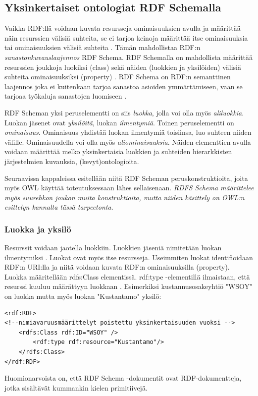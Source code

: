 \documentclass[finnish]{tktltiki2}
\theoremstyle{definition}
\theoremstyle{remark}
\begin{document}
\subsection{Yksinkertaiset ontologiat RDF Schemalla}

Vaikka RDF:llä voidaan kuvata resursseja ominaisuuksien avulla ja määrittää näin resurssien välisiä suhteita, se ei tarjoa keinoja määrittää itse ominaisuuksia tai
ominaisuuksien välisiä suhteita \cite{RDFS}. Tämän mahdollistaa RDF:n \textit{sanastonkuvauslaajennos}
RDF Schema. RDF Schemalla on mahdollista määrittää resurssien joukkoja luokiksi (class) sekä näiden (luokkien ja yksilöiden) välisiä suhteita ominaisuuksiksi (property) \cite{RDFS}. 
RDF Schema on RDF:n semanttinen laajennos joka ei kuitenkaan tarjoa sanastoa asioiden ymmärtämiseen, vaan se tarjoaa työkaluja sanastojen luomiseen \cite{RDFS}. 

RDF Scheman yksi peruselementti on siis \textit{luokka}, jolla voi olla myös \textit{aliluokkia}. Luokan jäsenet ovat \textit{yksilöitä}, luokan \textit{ilmentymiä}. Toinen peruselementti on \textit{ominaisuus}. Ominaisuus yhdistää luokan 
ilmentymiä toisiinsa, luo suhteen niiden välille. Ominaisuudella voi olla myös \textit{aliominaisuuksia}. Näiden elementtien avulla voidaan määrittää melko yksinkertaisia luokkien ja suhteiden hierarkkisten järjestelmien kuvauksia, (kevyt)ontologioita.  

Seuraavissa kappaleissa esitellään niitä RDF Scheman peruskonstruktioita, 
joita myös OWL käyttää toteutuksessaan lähes sellaisenaan. \emph{RDFS Schema määrittelee myös suurehkon joukon muita konstruktioita, mutta niiden käsittely on OWL:n esittelyn kannalta tässä tarpeetonta.} 

\subsubsection{Luokka ja yksilö}
Resurssit voidaan jaotella luokkiin. Luokkien jäseniä nimitetään luokan ilmentymiksi \cite{RDFS}. Luokat ovat myös itse resursseja. Useimmiten luokat identifioidaan RDF:n URI:lla ja niitä voidaan kuvata RDF:n ominaisuuksilla (property). Luokka määritellään rdfs:Class elementissä. rdf:type -elementillä ilmaistaan, että resurssi kuuluu määrättyyn luokkaan \cite{RDFS}. Esimerkiksi kustannusosakeyhtiö "WSOY" on luokka mutta myös luokan "Kustantamo" yksilö:
\begin{verbatim}
<rdf:RDF>
<!--nimiavaruusmäärittelyt poistettu yksinkertaisuuden vuoksi -->
    <rdfs:Class rdf:ID="WSOY" />
        <rdf:type rdf:resource="Kustantamo"/>
    </rdfs:Class>
</rdf:RDF>
\end{verbatim}
Huomionarvoista on, että RDF Schema -dokumentit ovat RDF-dokumentteja, jotka sisältävät kummankin kielen primitiivejä. 
\end{document}
